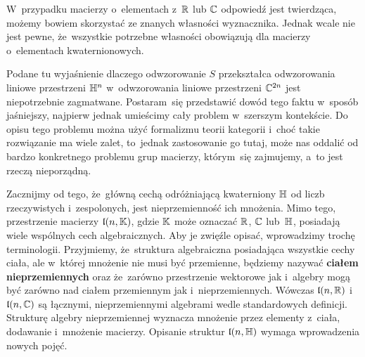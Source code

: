 \documentclass[a4paper,11pt]{article}
\numberwithin{equation}{section}
\begin{document}
W~przypadku macierzy o~elementach z~$\mathbb{R}$ lub $\mathbb{C}$ odpowiedź jest
twierdząca, możemy bowiem skorzystać ze znanych własności wyznacznika.
Jednak wcale nie jest pewne, że~wszystkie potrzebne własności obowiązują
dla macierzy o~elementach kwaternionowych.

\VerSpaceFour





\noindent
{} Podane tu wyjaśnienie dlaczego odwzorowanie $S$ przekształca
odwzorowania liniowe przestrzeni $\mathbb{H}^{ n }$ w~odwzorowania liniowe
przestrzeni $\mathbb{C}^{ 2n }$ jest niepotrzebnie zagmatwane. Postaram~się
przedstawić dowód tego faktu w~sposób jaśniejszy, najpierw jednak
umieścimy cały problem w~szerszym kontekście. Do opisu tego problemu
można użyć formalizmu teorii kategorii i~choć takie rozwiązanie ma wiele
zalet, to~jednak zastosowanie go tutaj, może nas oddalić od bardzo
konkretnego problemu grup macierzy, którym~się zajmujemy, a~to jest rzeczą
nieporządną.

Zacznijmy od tego, że~główną cechą odróżniającą kwaterniony $\mathbb{H}$ od liczb
rzeczywistych i~zespolonych, jest nieprzemienność ich mnożenia. Mimo tego,
przestrzenie macierzy $\mathfrak{l}( n, \mathbb{K} )$, gdzie $\mathbb{K}$ może oznaczać
$\mathbb{R}$, $\mathbb{C}$ lub~$\mathbb{H}$, posiadają wiele wspólnych cech algebraicznych.
Aby je zwięźle opisać, wprowadzimy trochę terminologii. Przyjmiemy,
że~struktura algebraiczna posiadająca wszystkie cechy ciała, ale w~której
mnożenie nie musi być przemienne, będziemy nazywać \textbf{ciałem
  nieprzemiennych} oraz że~zarówno przestrzenie wektorowe jak i~algebry mogą
być zarówno nad ciałem przemiennym jak i~nieprzemiennych. Wówczas
$\mathfrak{l}( n, \mathbb{R} )$ i~$\mathfrak{l}( n, \mathbb{C} )$ są łącznymi, nieprzemiennymi
algebrami wedle standardowych definicji. Strukturę algebry nieprzemiennej
wyznacza mnożenie przez elementy z~ciała, dodawanie i~mnożenie macierzy.
Opisanie struktur $\mathfrak{l}( n, \mathbb{H} )$ wymaga wprowadzenia nowych pojęć.
\end{document}
